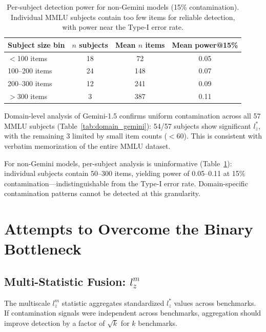\documentclass[11pt,a4paper]{article}
\newcommand{\lzstar}{$l_{z}^{*}$}
\newcommand{\lzm}{$l_{z}^{m}$}
\begin{document}
\begin{table}[t]
\centering
\caption{Per-subject detection power for non-Gemini models (15\% contamination). Individual MMLU subjects contain too few items for reliable detection, with power near the Type-I error rate.}
\label{tab:domain_power}
\small
\begin{tabular}{@{}lccc@{}}
\toprule
Subject size bin & $n$ subjects & Mean $n$ items & Mean power@15\% \\
\midrule
$<$100 items & 18 & 72 & 0.05 \\
100--200 items & 24 & 148 & 0.07 \\
200--300 items & 12 & 241 & 0.09 \\
$>$300 items & 3 & 387 & 0.11 \\
\bottomrule
\end{tabular}
\end{table}

Domain-level analysis of Gemini-1.5 confirms uniform contamination across all 57 MMLU subjects (Table~\ref{tab:domain_gemini}): 54/57 subjects show significant $l_z^*$, with the remaining 3 limited by small item counts ($<$60). This is consistent with verbatim memorization of the entire MMLU dataset.

For non-Gemini models, per-subject analysis is uninformative (Table~\ref{tab:domain_power}): individual subjects contain 50--300 items, yielding power of 0.05--0.11 at 15\% contamination---indistinguishable from the Type-I error rate. Domain-specific contamination patterns cannot be detected at this granularity.

\section{Attempts to Overcome the Binary Bottleneck}

\subsection{Multi-Statistic Fusion: \lzm{}}
\label{sec:lzm}

The multiscale \lzm{} statistic \citep{hong2021} aggregates standardized \lzstar{} values across benchmarks. If contamination signals were independent across benchmarks, aggregation should improve detection by a factor of $\sqrt{k}$ for $k$ benchmarks.
\end{document}
